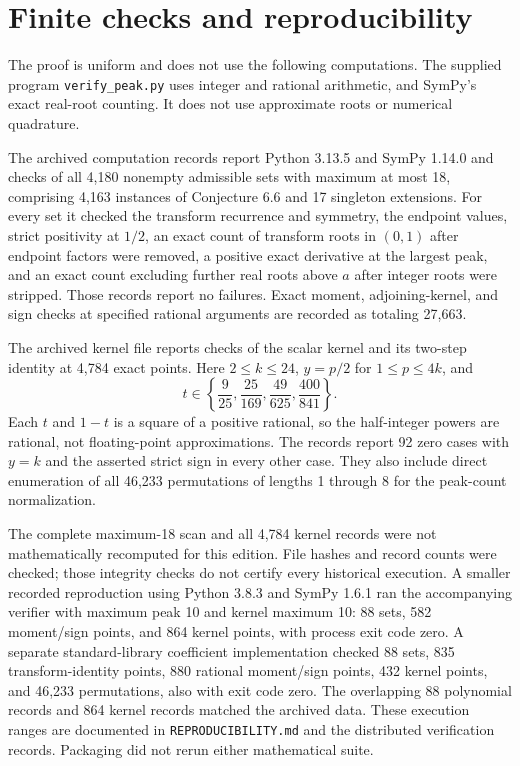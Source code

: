 \documentclass[11pt]{article}
\theoremstyle{definition}
\begin{document}
\section{Finite checks and reproducibility}
The proof is uniform and does not use the following computations. The supplied program \texttt{verify\_peak.py} uses integer and rational arithmetic, and SymPy's exact real-root counting. It does not use approximate roots or numerical quadrature.

The archived computation records report Python 3.13.5 and SymPy 1.14.0 and checks of all 4,180 nonempty admissible sets with maximum at most 18, comprising 4,163 instances of Conjecture 6.6 and 17 singleton extensions. For every set it checked the transform recurrence and symmetry, the endpoint values, strict positivity at $1/2$, an exact count of transform roots in $(0,1)$ after endpoint factors were removed, a positive exact derivative at the largest peak, and an exact count excluding further real roots above $a$ after integer roots were stripped. Those records report no failures. Exact moment, adjoining-kernel, and sign checks at specified rational arguments are recorded as totaling 27,663.

The archived kernel file reports checks of the scalar kernel and its two-step identity at 4,784 exact points. Here $2\le k\le24$, $y=p/2$ for $1\le p\le4k$, and
\[
 t\in\left\{\frac9{25},\frac{25}{169},\frac{49}{625},\frac{400}{841}\right\}.
\]
Each $t$ and $1-t$ is a square of a positive rational, so the half-integer powers are rational, not floating-point approximations. The records report 92 zero cases with $y=k$ and the asserted strict sign in every other case. They also include direct enumeration of all 46,233 permutations of lengths 1 through 8 for the peak-count normalization.

The complete maximum-18 scan and all 4,784 kernel records were not mathematically
recomputed for this edition. File hashes and record counts were checked; those
integrity checks do not certify every historical execution. A smaller recorded
reproduction using Python 3.8.3 and SymPy 1.6.1 ran the accompanying verifier
with maximum peak 10 and kernel maximum 10: 88 sets, 582 moment/sign points,
and 864 kernel points, with process exit code zero. A separate standard-library
coefficient implementation checked 88 sets, 835 transform-identity points,
880 rational moment/sign points, 432 kernel points, and 46,233 permutations,
also with exit code zero. The overlapping 88 polynomial records and 864 kernel
records matched the archived data. These execution ranges are documented in
\texttt{REPRODUCIBILITY.md} and the distributed verification records. Packaging
did not rerun either mathematical suite.
\end{document}
